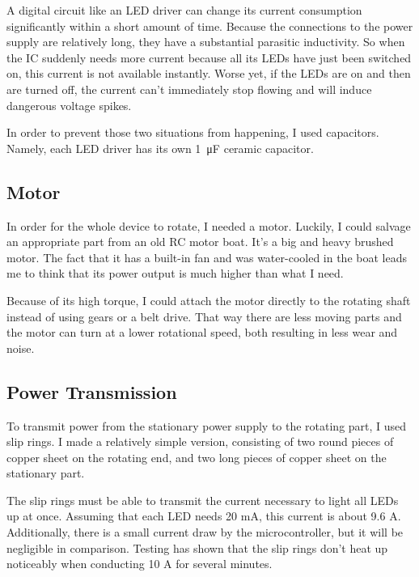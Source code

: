 \documentclass[a4paper, 11pt, titlepage]{report}
\begin{document}
A digital circuit like an LED driver can change its current consumption significantly within a
short amount of time. Because the connections to the power supply are relatively long, they have
a substantial parasitic inductivity. So when the IC suddenly needs more current because all its
LEDs have just been switched on, this current is not available instantly. Worse yet, if the LEDs
are on and then are turned off, the current can't immediately stop flowing and will induce
dangerous voltage spikes.

In order to prevent those two situations from happening, I used capacitors. Namely, each LED
driver has its own \SI{1}{\micro\farad}  ceramic capacitor.



\subsection{Motor}

In order for the whole device to rotate, I needed a motor. Luckily, I could salvage an appropriate
part from an old RC motor boat. It's a big and heavy brushed motor. The fact that it has a built-in
fan and was water-cooled in the boat leads me to think that its power output is much higher than
what I need.

Because of its high torque, I could attach the motor directly to the rotating shaft instead of
using gears or a belt drive. That way there are less moving parts and the motor can turn at a lower
rotational speed, both resulting in less wear and noise.



\subsection{Power Transmission}

To transmit power from the stationary power supply to the rotating part, I used slip rings. I made
a relatively simple version, consisting of two round pieces of copper sheet on the rotating end,
and two long pieces of copper sheet on the stationary part.

The slip rings must be able to transmit the current necessary to light all LEDs up at once.
Assuming that each LED needs 20 mA, this current is about 9.6 A. Additionally, there is a small
current draw by the microcontroller, but it will be negligible in comparison. Testing has shown
that the slip rings don't heat up noticeably when conducting 10 A for several minutes.
\end{document}
